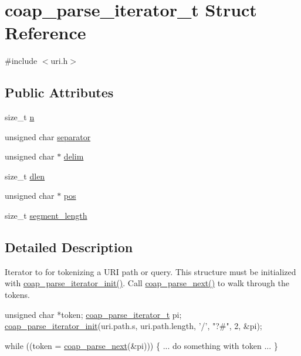 \hypertarget{structcoap__parse__iterator__t}{}\section{coap\+\_\+parse\+\_\+iterator\+\_\+t Struct Reference}
\label{structcoap__parse__iterator__t}


{\ttfamily \#include $<$uri.\+h$>$}

\subsection*{Public Attributes}
\begin{DoxyCompactItemize}
\item 
size\+\_\+t \hyperlink{structcoap__parse__iterator__t_add880e08de4e82ced1464839db82542f}{n}
\item 
unsigned char \hyperlink{structcoap__parse__iterator__t_a849064fa32d9021c6a634232eb89803f}{separator}
\item 
unsigned char $\ast$ \hyperlink{structcoap__parse__iterator__t_a99403d81b015a9546076418818e2a9e8}{delim}
\item 
size\+\_\+t \hyperlink{structcoap__parse__iterator__t_a77fe2df68b100c25377467c4e9800d3b}{dlen}
\item 
unsigned char $\ast$ \hyperlink{structcoap__parse__iterator__t_adee3cf3ea7a964650516a056ee437109}{pos}
\item 
size\+\_\+t \hyperlink{structcoap__parse__iterator__t_a8349e7131718619149694cd5ac337537}{segment\+\_\+length}
\end{DoxyCompactItemize}


\subsection{Detailed Description}
Iterator to for tokenizing a U\+R\+I path or query. This structure must be initialized with \hyperlink{group__uri__parse_gaa794ada6b7c7c6c4009e153924f8e2f8}{coap\+\_\+parse\+\_\+iterator\+\_\+init()}. Call \hyperlink{group__uri__parse_ga4c3bd9d741abdb8ea91792af2eb9dc14}{coap\+\_\+parse\+\_\+next()} to walk through the tokens.


\begin{DoxyCode}
\textcolor{keywordtype}{unsigned} \textcolor{keywordtype}{char} *token;
\hyperlink{structcoap__parse__iterator__t}{coap\_parse\_iterator\_t} pi;
\hyperlink{group__uri__parse_gaa794ada6b7c7c6c4009e153924f8e2f8}{coap\_parse\_iterator\_init}(uri.path.s, uri.path.length, \textcolor{charliteral}{'/'}, \textcolor{stringliteral}{"?#"}, 2, &pi);

\textcolor{keywordflow}{while} ((token = \hyperlink{group__uri__parse_ga4c3bd9d741abdb8ea91792af2eb9dc14}{coap\_parse\_next}(&pi))) \{
  ... \textcolor{keywordflow}{do} something with token ...
\}
\end{DoxyCode}
 

